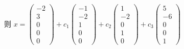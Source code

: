 		 则 \( x = \begin{pmatrix}
			 -2 \\
			 3  \\
			 0  \\
			 0  \\
			 0
		 \end{pmatrix} + c_{1}\begin{pmatrix}
			 -1 \\
			 -2 \\
			 1  \\
			 0  \\
			 0
		 \end{pmatrix} + c_{2}\begin{pmatrix}
			 1  \\
			 -2 \\
			 0  \\
			 1  \\
			 0
		 \end{pmatrix} + c_{3}\begin{pmatrix}
			 5  \\
			 -6 \\
			 0  \\
			 0  \\
			 1
		 \end{pmatrix} \)


